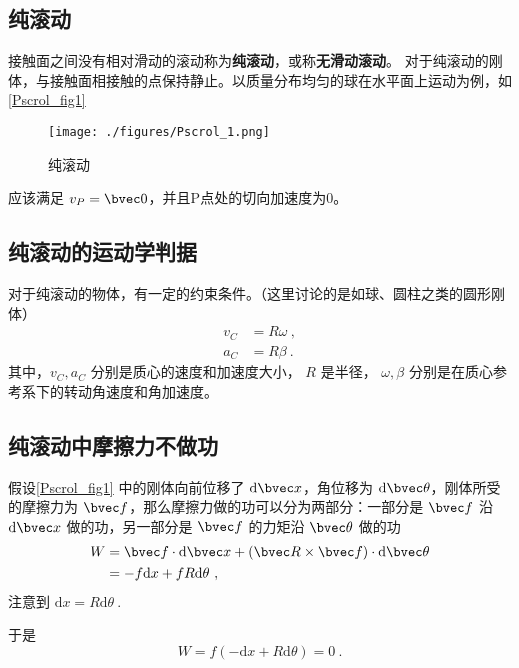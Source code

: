 

\subsection{纯滚动}
接触面之间没有相对滑动的滚动称为\textbf{纯滚动}，或称\textbf{无滑动滚动}。
对于纯滚动的刚体，与接触面相接触的点保持静止。以质量分布均匀的球在水平面上运动为例，如\autoref{Pscrol_fig1}
\begin{figure}[ht]
\centering
\texttt{[image: ./figures/Pscrol\_1.png]}
\caption{纯滚动} \label{Pscrol_fig1}
\end{figure}
应该满足 $v_P=\bvec 0$，并且P点处的切向加速度为0。

\subsection{纯滚动的运动学判据}
对于纯滚动的物体，有一定的约束条件。（这里讨论的是如球、圆柱之类的圆形刚体）
\begin{equation}
\begin{aligned}
v_C&=R\omega~,\\
a_C&=R\beta~.
\end{aligned}
\end{equation}
其中，$v_C,a_C$
分别是质心的速度和加速度大小，
$R$ 是半径，
$\omega,\beta$ 分别是在质心参考系下的转动角速度和角加速度。

\subsection{纯滚动中摩擦力不做功}
假设\autoref{Pscrol_fig1} 中的刚体向前位移了 $\mathrm{d}\bvec x$，角位移为 $\mathrm{d} \bvec \theta$，刚体所受的摩擦力为 $\bvec f$，那么摩擦力做的功可以分为两部分：一部分是 $\bvec f$ 沿 $\mathrm{d} \bvec x$ 做的功，另一部分是 $\bvec f$ 的力矩沿 $\bvec \theta$ 做的功
\begin{equation}
\begin{aligned}
W&=\bvec f\cdot\mathrm{d} \bvec x+(\bvec R\times \bvec f)\cdot\mathrm{d} \bvec \theta\\
&=-f\mathrm{d} x+fR\mathrm{d} \theta~,
\end{aligned}
\end{equation}
注意到 $\mathrm{d} x=R\mathrm{d} \theta~.$

于是\begin{equation}
W=f(-\mathrm{d} x+R\mathrm{d} \theta)=0~.
\end{equation}
